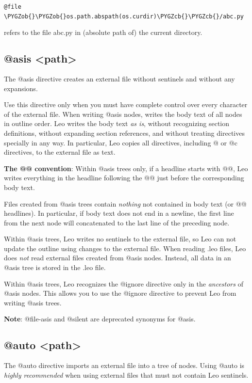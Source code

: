 \documentclass[a4paper,10pt,english]{sphinxmanual}
\def\PYGZob{\char`\{}
\def\PYGZcb{\char`\}}
\begin{document}
\begin{Verbatim}[commandchars=\\\{\}]
@file \PYGZob{}\PYGZob{}os.path.abspath(os.curdir)\PYGZcb{}\PYGZcb{}/abc.py
\end{Verbatim}

refers to the file abc.py in (absolute path of) the current directory.


\subsection{@asis \textless{}path\textgreater{}}
\label{directives:asis-path}
The @asis directive creates an external file without sentinels and without any
expansions.

Use this directive only when you must have complete control over every character
of the external file. When writing @asis nodes, writes the body text of all
nodes in outline order. Leo writes the body text \emph{as is}, without recognizing
section definitions, without expanding section references, and without treating
directives specially in any way. In particular, Leo copies all directives,
including @ or @c directives, to the external file as text.

\textbf{The @@ convention}: Within @asis trees only, if a headline starts with @@,
Leo writes everything in the headline following the @@ just before the
corresponding body text.

Files created from @asis trees contain \emph{nothing} not contained in body text (or
@@ headlines). In particular, if body text does not end in a newline, the first
line from the next node will concatenated to the last line of the preceding
node.

Within @asis trees, Leo writes no sentinels to the external file, so Leo can not update the outline
using changes to the external file. When reading .leo files, Leo does \emph{not} read
external files created from @asis nodes. Instead, all data in an @asis tree is
stored in the .leo file.

Within @asis trees, Leo recognizes the @ignore directive only in the
\emph{ancestors} of @asis nodes. This allows you to use the @ignore directive to
prevent Leo from writing @asis trees.

\textbf{Note}: @file-asis and @silent are deprecated synonyms for @asis.


\subsection{@auto \textless{}path\textgreater{}}
\label{directives:auto-path}
The @auto directive imports an external file into a tree of nodes. Using @auto
is \emph{highly recommended} when using external files that must not contain Leo
sentinels.
\end{document}
